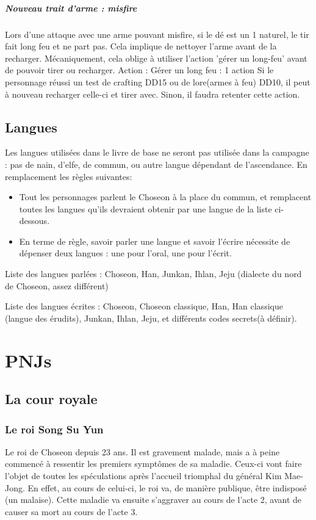 \documentclass[10pt,a4paper]{book}
\begin{document}
\paragraph{Nouveau trait d'arme : misfire}
Lors d'une attaque avec une arme pouvant misfire, si le dé est un 1 naturel, le tir fait long feu et ne part pas. Cela implique de nettoyer l'arme avant de la recharger. Mécaniquement, cela oblige à utiliser l'action 'gérer un long-feu' avant de pouvoir tirer ou recharger.
Action :
Gérer un long feu : 1 action
Si le personnage réussi un test de crafting DD15 ou de lore(armes à feu) DD10, il peut à nouveau recharger celle-ci et tirer avec. Sinon, il faudra retenter cette action.

\section{Langues}

Les langues utilisées dans le livre de base ne seront pas utilisée dans la campagne : pas de nain, d'elfe, de commun, ou autre langue dépendant de l'ascendance.
En remplacement les règles suivantes:
\begin{itemize}
\item Tout les personnages parlent le Choseon à la place du commun, et remplacent toutes les langues qu'ils devraient obtenir par une langue de la liste ci-dessous.
\item En terme de règle, savoir parler une langue et savoir l'écrire nécessite de dépenser deux langues : une pour l'oral, une pour l'écrit. 
\end{itemize}


Liste des langues parlées : Choseon, Han, Junkan, Ihlan, Jeju (dialecte du nord de Choseon, assez différent)

Liste des langues écrites : Choseon, Choseon classique, Han, Han classique (langue des érudits), Junkan, Ihlan, Jeju, et différents codes secrets(à définir).

\chapter{PNJs}
\section{La cour royale}
\subsection{Le roi Song Su Yun}
Le roi de Choseon depuis 23 ans. Il est gravement malade, mais a à peine commencé à ressentir les premiers symptômes de sa maladie. Ceux-ci vont faire l'objet de toutes les spéculations après l'accueil triomphal du général Kim Mae-Jong. En effet, au cours de celui-ci, le roi va, de manière publique, être indisposé (un malaise). Cette maladie va ensuite s'aggraver au cours de l'acte 2, avant de causer sa mort au cours de l'acte 3.
\end{document}
